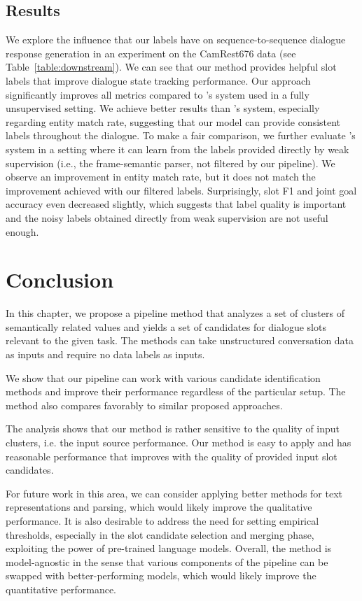 \subsection{Results} We explore the influence that our labels have on sequence-to-sequence dialogue response generation in an experiment on the CamRest676 data (see Table~\ref{table:downstream}).
We can see that our method provides helpful slot labels that improve dialogue state tracking performance.
Our approach significantly improves all metrics compared to \citet{jin2018explicit}'s system used in a fully unsupervised setting.
We achieve better results than \citet{jin2018explicit}'s system, especially regarding entity match rate, suggesting that our model can provide consistent labels throughout the dialogue.
To make a fair comparison, we further evaluate \citet{jin2018explicit}'s system in a setting where it can learn from the labels provided directly by weak supervision (i.e., the frame-semantic parser, not filtered by our pipeline).
We observe an improvement in entity match rate, but it does not match the improvement achieved with our filtered labels. Surprisingly, slot F1 and joint goal accuracy even decreased slightly, 
which suggests that label quality is important and the noisy labels obtained directly from weak supervision are not useful enough.

\section{Conclusion}
In this chapter, we propose a pipeline method that analyzes a set of clusters of semantically related values and yields a set of candidates for dialogue slots relevant to the given task.
The methods can take unstructured conversation data as inputs and require no data labels as inputs.

We show that our pipeline can work with various candidate identification methods and improve their performance regardless of the particular setup.
The method also compares favorably to similar proposed approaches.

The analysis shows that our method is rather sensitive to the quality of input clusters, i.e. the input source performance.
Our method is easy to apply and has reasonable performance that improves with the quality of provided input slot candidates.

For future work in this area, we can consider applying better methods for text representations and parsing, which would likely improve the qualitative performance.
It is also desirable to address the need for setting empirical thresholds, especially in the slot candidate selection and merging phase, exploiting the power of pre-trained language models.
Overall, the method is model-agnostic in the sense that various components of the pipeline can be swapped with better-performing models, which would likely improve the quantitative performance.